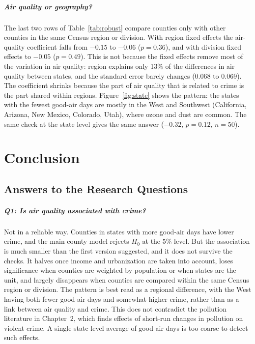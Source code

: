 \documentclass[12pt,letterpaper]{report}
\begin{document}
\paragraph{Air quality or geography?} The last two rows of Table~\ref{tab:robust} compare
counties only with other counties in the same Census region or division. With region fixed
effects the air-quality coefficient falls from $-0.15$ to $-0.06$ ($p=0.36$), and with
division fixed effects to $-0.05$ ($p=0.49$). This is not because the fixed effects remove
most of the variation in air quality: region explains only 13\% of the differences in air
quality between states, and the standard error barely changes (0.068 to 0.069). The
coefficient shrinks because the part of air quality that is related to crime is the part
shared within regions. Figure~\ref{fig:state} shows the pattern: the states with the fewest
good-air days are mostly in the West and Southwest (California, Arizona, New Mexico,
Colorado, Utah), where ozone and dust are common. The same check at the state level gives
the same answer ($-0.32$, $p=0.12$, $n=50$).

\begin{table}[H]
\centering
\caption{Robustness of the air-quality coefficient in Model~4. Standard errors clustered by
state.}
\label{tab:robust}
\small

\end{table}

\chapter{Conclusion}

\section{Answers to the Research Questions}
\paragraph{Q1: Is air quality associated with crime?} Not in a reliable way. Counties in
states with more good-air days have lower crime, and the main county model rejects $H_0$ at
the 5\% level. But the association is much smaller than the first version suggested, and it
does not survive the checks. It halves once income and urbanization are taken into account,
loses significance when counties are weighted by population or when states are the unit, and
largely disappears when counties are compared within the same Census region or division.
The pattern is best read as a regional difference, with the West having both fewer good-air
days and somewhat higher crime, rather than as a link between air quality and crime. This
does not contradict the pollution literature in Chapter~2, which finds effects of
short-run changes in pollution on violent crime. A single state-level average of
good-air days is too coarse to detect such effects.
\end{document}
